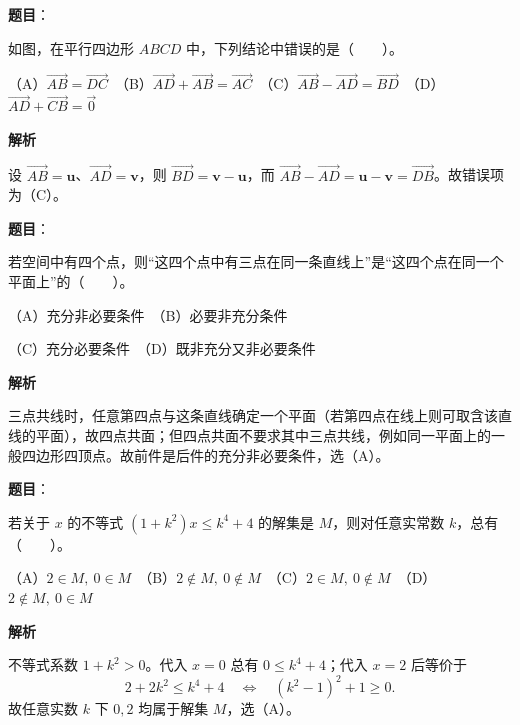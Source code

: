 \begin{answer}

\textbf{题目}：

如图，在平行四边形 $ABCD$ 中，下列结论中错误的是\mbox{（　　）}。

（A）$\overrightarrow{AB}=\overrightarrow{DC}$　（B）$\overrightarrow{AD}+\overrightarrow{AB}=\overrightarrow{AC}$　（C）$\overrightarrow{AB}-\overrightarrow{AD}=\overrightarrow{BD}$　（D）$\overrightarrow{AD}+\overrightarrow{CB}=\vec 0$
\nopagebreak[4]
\begin{center}\end{center}
\nopagebreak[4]
\textbf{解析}

设 $\overrightarrow{AB}=\mathbf u$、$\overrightarrow{AD}=\mathbf v$，则 $\overrightarrow{BD}=\mathbf v-\mathbf u$，而 $\overrightarrow{AB}-\overrightarrow{AD}=\mathbf u-\mathbf v=\overrightarrow{DB}$。故错误项为（C）。


\end{answer}
\begin{answer}

\textbf{题目}：

若空间中有四个点，则“这四个点中有三点在同一条直线上”是“这四个点在同一个平面上”的\mbox{（　　）}。

（A）充分非必要条件　（B）必要非充分条件

（C）充分必要条件　（D）既非充分又非必要条件

\textbf{解析}

三点共线时，任意第四点与这条直线确定一个平面（若第四点在线上则可取含该直线的平面），故四点共面；但四点共面不要求其中三点共线，例如同一平面上的一般四边形四顶点。故前件是后件的充分非必要条件，选（A）。


\end{answer}
\begin{answer}

\textbf{题目}：

若关于 $x$ 的不等式 $(1+k^2)x\le k^4+4$ 的解集是 $M$，则对任意实常数 $k$，总有\mbox{（　　）}。

（A）$2\in M,\ 0\in M$　（B）$2\notin M,\ 0\notin M$　（C）$2\in M,\ 0\notin M$　（D）$2\notin M,\ 0\in M$

\textbf{解析}

不等式系数 $1+k^2>0$。代入 $x=0$ 总有 $0\le k^4+4$；代入 $x=2$ 后等价于
\nopagebreak[4]
\[
2+2k^2\le k^4+4\quad\Longleftrightarrow\quad(k^2-1)^2+1\ge0.
\]
故任意实数 $k$ 下 $0,2$ 均属于解集 $M$，选（A）。


\end{answer}
